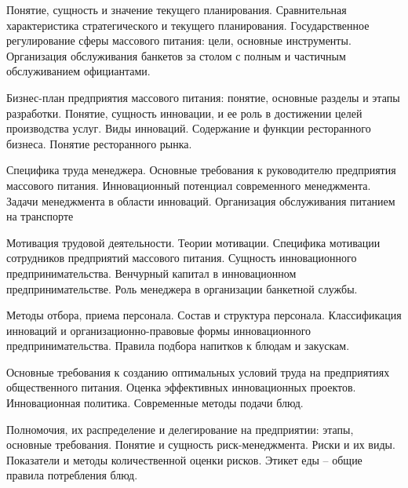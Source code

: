 \documentclass[
	11pt,
	a4paper,
	]
	{article}
\begin{document}
\bigskip

\noindent{} 
	{
		Понятие, сущность и значение текущего планирования. Сравнительная характеристика стратегического и текущего планирования.
	}{
		Государственное регулирование сферы массового питания: цели, основные инструменты.
	}{
		Организация обслуживания банкетов за столом с полным и частичным обслуживанием официантами.
	}

\bigskip

\noindent{} 
	{
		Бизнес-план предприятия массового питания: понятие, основные разделы и этапы разработки.
	}{
		Понятие, сущность инновации, и ее роль в достижении целей производства услуг. Виды инноваций.
	}{
		Содержание и функции ресторанного бизнеса. Понятие ресторанного рынка.
	}

\bigskip

\noindent{} 
	{
		Специфика труда менеджера. Основные требования к руководителю предприятия массового питания.
	}{
		Инновационный потенциал современного менеджмента. Задачи менеджмента в области инноваций.
	}{
		Организация обслуживания питанием на транспорте
	}

\bigskip

\noindent{} 
	{
		Мотивация трудовой деятельности. Теории мотивации. Специфика мотивации сотрудников предприятий массового питания.
	}{
		Сущность инновационного предпринимательства. Венчурный капитал в инновационном предпринимательстве.
	}{
		Роль менеджера в организации банкетной службы.
	}

\bigskip

\noindent{} 
	{
		Методы отбора, приема персонала. Состав и структура персонала.
	}{
		Классификация инноваций и организационно-правовые формы инновационного предпринимательства.
	}{
		Правила подбора напитков к блюдам и закускам.
	}

\bigskip

\noindent{} 
	{
		Основные требования к созданию оптимальных условий труда на предприятиях общественного питания.
	}{
		Оценка эффективных инновационных проектов. Инновационная политика.
	}{
		Современные методы подачи блюд.
	}

\bigskip

\noindent{} 
	{
		Полномочия, их распределение и делегирование на предприятии: этапы, основные требования.
	}{
		Понятие и сущность риск-менеджмента. Риски и их виды. Показатели и методы количественной оценки рисков.
	}{
		Этикет еды – общие правила потребления блюд.
	}
\end{document}
